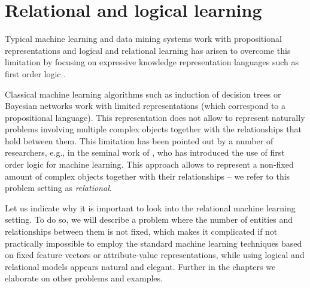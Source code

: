 \section{Relational and logical learning}
Typical machine learning and data mining systems work with
propositional representations and logical and relational learning has
arisen to overcome this limitation by focusing on expressive knowledge representation languages such as first order logic \parencite{luc_book}.

Classical machine learning algorithms such as induction of decision trees
\parencite{decision_trees} or Bayesian networks \parencite{pearl} work
with limited representations (which correspond to a
propositional language). This representation does not allow to
represent naturally problems involving multiple complex objects
together with the relationships that hold between them. This limitation has been
pointed out by a number of researchers, e.g., in the seminal work of
\textcite{plotkin}, who has introduced  the use of first order logic
for machine learning. This approach allows to
represent a non-fixed amount of complex objects together with their
relationships -- we refer to this problem setting as \textit{relational}.

Let us indicate why it is important to look into the relational
machine learning setting. To do so, we will describe a problem where
the number of entities and relationships between them is not fixed,
which makes it complicated if not practically impossible to employ the
standard machine learning techniques based on  fixed feature vectors
or attribute-value representations, while using logical and relational models appears natural and elegant. Further in the chapters we elaborate on other problems and examples.

